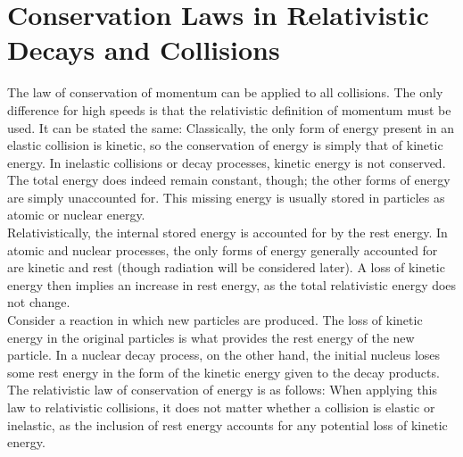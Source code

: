 \documentclass{subfiles}
\begin{document}
	\section{Conservation Laws in Relativistic Decays and Collisions}
		The law of conservation of momentum can be applied to all collisions. The only difference for high speeds is that the relativistic definition of momentum must be used. It can be stated the same:
		Classically, the only form of energy present in an elastic collision is kinetic, so the conservation of energy is simply that of kinetic energy. In inelastic collisions or decay processes, kinetic energy is not conserved. The total energy does indeed remain constant, though; the other forms of energy are simply unaccounted for. This missing energy is usually stored in particles as atomic or nuclear energy. \\
		Relativistically, the internal stored energy is accounted for by the rest energy. In atomic and nuclear processes, the only forms of energy generally accounted for are kinetic and rest (though radiation will be considered later). A loss of kinetic energy then implies an increase in rest energy, as the total relativistic energy does not change. \\
			Consider a reaction in which new particles are produced. The loss of kinetic energy in the original particles is what provides the rest energy of the new particle. In a nuclear decay process, on the other hand, the initial nucleus loses some rest energy in the form of the kinetic energy given to the decay products. \\
			The relativistic law of conservation of energy is as follows:
			When applying this law to relativistic collisions, it does not matter whether a collision is elastic or inelastic, as the inclusion of rest energy accounts for any potential loss of kinetic energy.
\end{document}
